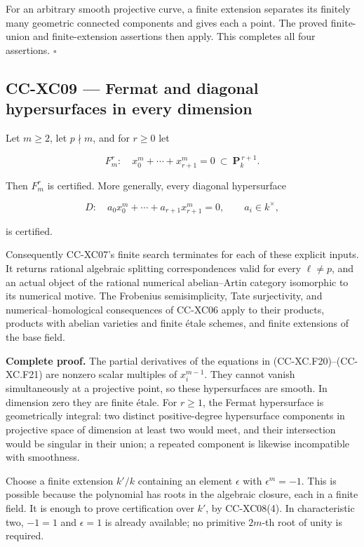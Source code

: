 For an arbitrary smooth projective curve, a finite extension separates
its finitely many geometric connected components and gives each a point.
The proved finite-union and finite-extension assertions then apply. This
completes all four assertions. \(\square\)

\subsection{CC-XC09 --- Fermat and diagonal hypersurfaces in every
dimension}\label{cc-xc09-fermat-and-diagonal-hypersurfaces-in-every-dimension}

Let \(m\ge2\), let \(p\nmid m\), and for \(r\ge0\) let

\[
 F_m^r:\quad x_0^m+\cdots+x_{r+1}^m=0
       \ \subset\ \mathbf P_k^{\,r+1}.
 \tag{CC-XC.F20}
\]

Then \(F_m^r\) is certified. More generally, every diagonal hypersurface

\[
 D:\quad a_0x_0^m+\cdots+a_{r+1}x_{r+1}^m=0,
 \qquad a_i\in k^\times,
 \tag{CC-XC.F21}
\]

is certified.

Consequently CC-XC07's finite search terminates for each of these
explicit inputs. It returns rational algebraic splitting correspondences
valid for every \(\ell\ne p\), and an actual object of the rational
numerical abelian--Artin category isomorphic to its numerical motive.
The Frobenius semisimplicity, Tate surjectivity, and
numerical--homological consequences of CC-XC06 apply to their products,
products with abelian varieties and finite étale schemes, and finite
extensions of the base field.

\textbf{Complete proof.} The partial derivatives of the equations in
(CC-XC.F20)--(CC-XC.F21) are nonzero scalar multiples of \(x_i^{m-1}\).
They cannot vanish simultaneously at a projective point, so these
hypersurfaces are smooth. In dimension zero they are finite étale. For
\(r\ge1\), the Fermat hypersurface is geometrically integral: two
distinct positive-degree hypersurface components in projective space of
dimension at least two would meet, and their intersection would be
singular in their union; a repeated component is likewise incompatible
with smoothness.

Choose a finite extension \(k'/k\) containing an element \(\epsilon\)
with \(\epsilon^m=-1\). This is possible because the polynomial has
roots in the algebraic closure, each in a finite field. It is enough to
prove certification over \(k'\), by CC-XC08(4). In characteristic two,
\(-1=1\) and \(\epsilon=1\) is already available; no primitive \(2m\)-th
root of unity is required.

